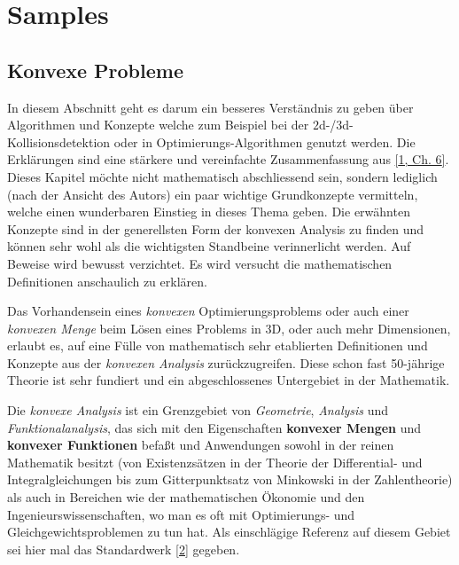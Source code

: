 \documentclass[
  british,
  12pt,
  paper=a4,
  twoside,
  titlepage=true,
  openright,
  abstract=on,
  toc=listofnumbered,
  numbers=noenddot,
  chapterprefix=true,
  headings=optiontohead,
  svgnames,
  dvipsnames]{scrreprt}
\begin{document}
\hypertarget{samples}{%
\chapter{Samples}\label{samples}}

\hypertarget{konvexe-probleme}{%
\section{Konvexe Probleme}\label{konvexe-probleme}}

In diesem Abschnitt geht es darum ein besseres Verständnis zu geben über
Algorithmen und Konzepte welche zum Beispiel bei der
\(2\)d-/\(3\)d-Kollisionsdetektion oder in Optimierungs-Algorithmen
genutzt werden. Die Erklärungen sind eine stärkere und vereinfachte
Zusammenfassung aus \protect\hyperlink{ref-nuetzig_thesis_2016}{{[}1,
Ch. 6{]}}. Dieses Kapitel möchte nicht mathematisch abschliessend sein,
sondern lediglich (nach der Ansicht des Autors) ein paar wichtige
Grundkonzepte vermitteln, welche einen wunderbaren Einstieg in dieses
Thema geben. Die erwähnten Konzepte sind in der generellsten Form der
konvexen Analysis zu finden und können sehr wohl als die wichtigsten
Standbeine verinnerlicht werden. Auf Beweise wird bewusst verzichtet. Es
wird versucht die mathematischen Definitionen anschaulich zu erklären.

Das Vorhandensein eines \emph{konvexen} Optimierungsproblems oder auch
einer \emph{konvexen Menge} beim Lösen eines Problems in \(3\)D, oder
auch mehr Dimensionen, erlaubt es, auf eine Fülle von mathematisch sehr
etablierten Definitionen und Konzepte aus der \emph{konvexen Analysis}
zurückzugreifen. Diese schon fast 50-jährige Theorie ist sehr fundiert
und ein abgeschlossenes Untergebiet in der Mathematik.

Die \emph{konvexe Analysis} ist ein Grenzgebiet von \emph{Geometrie},
\emph{Analysis} und \emph{Funktionalanalysis}, das sich mit den
Eigenschaften \textbf{konvexer Mengen} und \textbf{konvexer Funktionen}
befaßt und Anwendungen sowohl in der reinen Mathematik besitzt (von
Existenzsätzen in der Theorie der Differential- und Integralgleichungen
bis zum Gitterpunktsatz von Minkowski in der Zahlentheorie) als auch in
Bereichen wie der mathematischen Ökonomie und den
Ingenieurswissenschaften, wo man es oft mit Optimierungs- und
Gleichgewichtsproblemen zu tun hat. Als einschlägige Referenz auf diesem
Gebiet sei hier mal das Standardwerk
\protect\hyperlink{ref-rockafellar_convex_2015}{{[}2{]}} gegeben.
\end{document}
